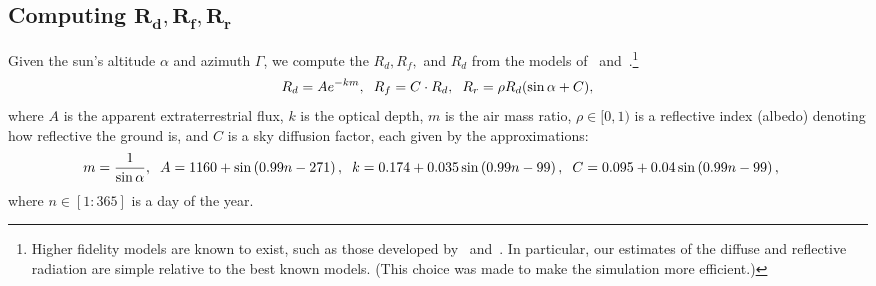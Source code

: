 \documentclass{article}
\begin{document}
{\subsection{Computing $\pmb{R_d, R_f, R_r}$}
Given the sun's altitude $\alpha$ and azimuth $\Gamma$, we compute the $R_d, R_f,$ and $R_d$ from the models of~\citet{threlkeld1957direct,Liu1960} and~\citet{masters2013renewable}.\footnote{Higher fidelity models are known to exist, such as those developed by~\citet{andersen1980comments,klein1977calculation} and~\citet{kamali2006estimating}. In particular, our estimates of the diffuse and reflective radiation are simple relative to the best known models. (This choice was made to make the simulation more efficient.)}
\begin{align}
R_d = A e^{-km}, \hspace{2mm} R_f = C \cdot R_d, \hspace{2mm} R_r = \rho R_d (\sin \alpha + C),
\end{align}
where $A$ is the apparent extraterrestrial flux, $k$ is the optical depth, $m$ is the air mass ratio, $\rho \in [0,1)$ is a reflective index (albedo) denoting how reflective the ground is, and $C$ is a sky diffusion factor, each given by the approximations:
\begin{align}
m&=\frac{1}{\sin \alpha}, \hspace{2mm} A = 1160 + \sin \left(0.99 n- 271\right), \hspace{2mm} k =0.174 + 0.035 \sin\left( 0.99 n - 99\right), \hspace{2mm} C=0.095 + 0.04 \sin\left(0.99 n-99\right),
\end{align}
where $n \in [1:365]$ is a day of the year.

}
\end{document}
